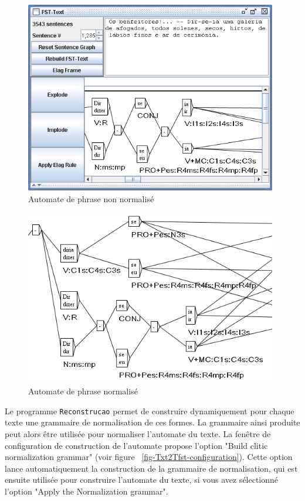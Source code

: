 \begin{figure}[!ht]
\begin{center}
\includegraphics[width=11cm]{resources/img/fig7-6.png}
\caption{Automate de phrase non normalisé\label{fig-1285-not-normalized}}
\end{center}
\end{figure}
\begin{figure}[!ht]
\begin{center}
\includegraphics[width=11cm]{resources/img/fig7-7.png}
\caption{Automate de phrase normalisé\label{fig-1285-normalized}}
\end{center}
\end{figure}
\clearpage

\bigskip
\noindent Le programme \verb+Reconstrucao+ permet de construire dynamiquement pour chaque texte
une grammaire de normalisation de ces formes. La grammaire ainsi produite peut alors être
utilisée pour normaliser l’automate du texte. La fenêtre de configuration de construction de
l’automate propose l’option "Build clitic normalization grammar" (voir figure
~\ref{fig-Txt2Tfst-configuration}). Cette option lance automatiquement la construction de la 
grammaire de normalisation, qui est ensuite utilisée pour construire l’automate du texte, 
si vous avez sélectionné l’option "Apply the Normalization grammar".





